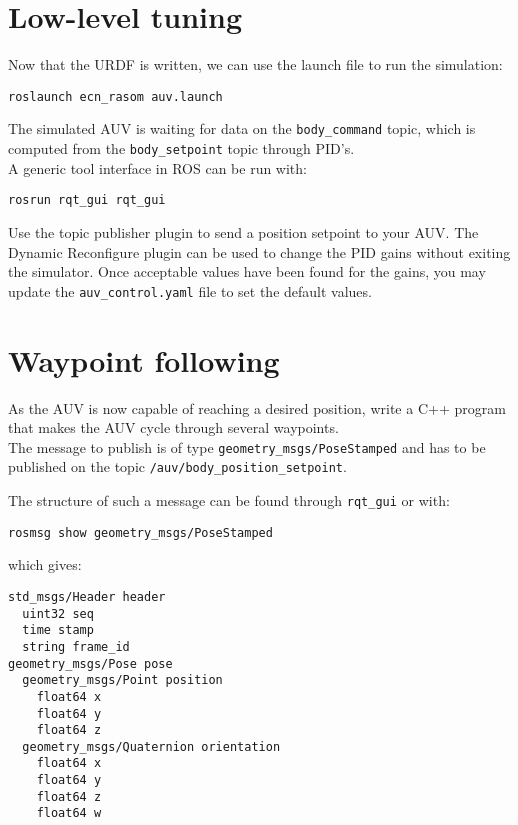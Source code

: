 \documentclass{ecnreport}
\begin{document}
\section{Low-level tuning}

Now that the URDF is written, we can use the launch file to run the simulation:
\begin{center}
\begin{lstlisting}
roslaunch ecn_rasom auv.launch
\end{lstlisting}
\end{center}
The simulated AUV is waiting for data on the \texttt{body\_command} topic, which is computed from the \texttt{body\_setpoint} topic through PID's.\\
A generic tool interface in ROS can be run with:
\begin{center}
\begin{lstlisting}
rosrun rqt_gui rqt_gui
\end{lstlisting}
\end{center}
Use the topic publisher plugin to send a position setpoint to your AUV. The Dynamic Reconfigure plugin can be used to change the PID gains without exiting the simulator.
Once acceptable values have been found for the gains, you may update the \texttt{auv\_control.yaml} file to set the default values.

\section{Waypoint following}


As the AUV is now capable of reaching a desired position, write a C++ program that makes the AUV cycle through several waypoints. \\
The message to publish is of type \texttt{geometry\_msgs/PoseStamped} and has to be published on the topic \texttt{/auv/body\_position\_setpoint}.

The structure of such a message can be found through \texttt{rqt\_gui} or with:
\begin{center}
\begin{lstlisting}
rosmsg show geometry_msgs/PoseStamped
\end{lstlisting}
\end{center}
which gives:
\begin{center}
\begin{lstlisting}
std_msgs/Header header
  uint32 seq
  time stamp
  string frame_id
geometry_msgs/Pose pose
  geometry_msgs/Point position
    float64 x
    float64 y
    float64 z
  geometry_msgs/Quaternion orientation
    float64 x
    float64 y
    float64 z
    float64 w

\end{lstlisting}
\end{center}
\end{document}
